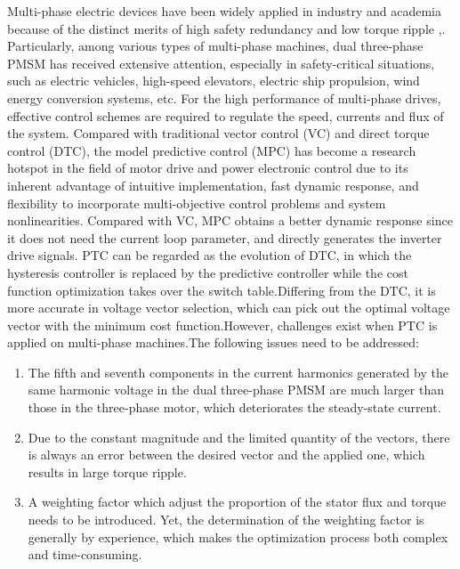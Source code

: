 \documentclass[sn-basic]{sn-jnl}
\theoremstyle{thmstyleone}%
\theoremstyle{thmstyletwo}%
\theoremstyle{thmstylethree}%
\theoremstyle{thmstyleone}%
\begin{document}
 Multi-phase electric devices have been widely applied in industry and academia because of the distinct merits of high safety redundancy and low torque ripple \cite{inbook},\cite{7110356}. Particularly, among various types of multi-phase machines, dual three-phase PMSM has received extensive attention, especially in safety-critical situations, such as electric vehicles\cite{8036279}, high-speed elevators\cite{6170558}, electric ship propulsion\cite{6469209}, wind energy conversion systems\cite{7781416}, etc. For the high performance of multi-phase drives, effective control schemes are required to regulate the speed, currents and flux of the system. Compared with traditional vector control (VC) and direct torque control (DTC), the model predictive control (MPC) has become a research hotspot in the field of motor drive and power electronic control due to its inherent advantage of intuitive implementation, fast dynamic response, and flexibility to incorporate multi-objective control problems and system nonlinearities\cite{7733147}. Compared with VC, MPC obtains a better dynamic response since it does not need the current loop parameter, and directly generates the inverter drive signals\cite{5784326}. PTC can be regarded as the evolution of DTC, in which the hysteresis controller is replaced by the predictive controller while the cost function optimization takes over the switch table.Differing from the DTC, it is more accurate in voltage vector selection, which can pick out the optimal voltage vector with the minimum cost function\cite{8936566}.However, challenges exist when PTC is applied on multi-phase machines.The following issues need to be addressed:
\begin{enumerate}
\item The fifth and seventh components in the current harmonics generated by the same harmonic voltage in the dual three-phase PMSM are much larger than those in the three-phase motor, which deteriorates the steady-state current.
\item  Due to the constant magnitude and the limited quantity of the vectors, there is always an error between the desired vector and the applied one, which results in large torque ripple.
\item  A weighting factor which adjust the proportion of the stator flux and torque needs to be introduced. Yet, the determination of the weighting factor is generally by experience, which makes the optimization process both complex and time-consuming.
\end{enumerate}
 
\end{document}
